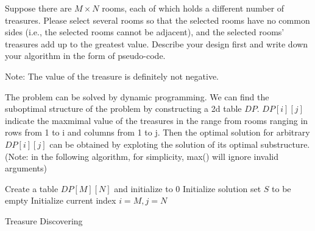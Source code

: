 \begin{exercise}[]{Suppose there are $M \times N$ rooms, each of which holds a different number of treasures. Please select several rooms so that the selected rooms have no common sides (i.e., the selected rooms cannot be adjacent), and the selected rooms' treasures add up to the greatest value.
    Describe your design first and write down your algorithm in the form of pseudo-code.
    
    Note: The value of the treasure is definitely not negative.}
  \begin{solution} The problem can be solved by dynamic programming. We can find the suboptimal structure of the problem by constructing a 2d table $DP$. $DP[i][j]$ indicate the maxmimal value of the treasures in the range from rooms ranging in rows from 1 to i and columns from 1 to j. Then the optimal solution for arbitrary $DP[i][j]$ can be obtained by exploting the solution of its optimal substructure. (Note: in the following algorithm, for simplicity, max() will ignore invalid arguments)

  \begin{algorithm}[H]
    \BlankLine
    Create a table $DP[M][N]$ and initialize to 0\;
    \For{$i=2:M$}{
      \For{$j=1:N$}{
        $DP[i][j] = \max(DP[i][j-2] + v[i][j],DP[i-2][j]+ v[i][j], DP[i-1][j], DP[i][j-1],DP[i-1][j-1]])$
      }
    }
    Initialize solution set $S$ to be empty\;
    Initialize current index $i = M, j = N$\;
    \caption{Treasure Discovering}
  \end{algorithm}


  \end{solution}
  \label{ex2}
\end{exercise}


